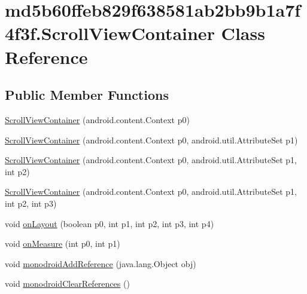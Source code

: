 \hypertarget{classmd5b60ffeb829f638581ab2bb9b1a7f4f3f_1_1_scroll_view_container}{
\section{md5b60ffeb829f638581ab2bb9b1a7f4f3f.ScrollViewContainer Class Reference}
\label{classmd5b60ffeb829f638581ab2bb9b1a7f4f3f_1_1_scroll_view_container}
}
\subsection*{Public Member Functions}
\begin{CompactItemize}
\item 
\hyperlink{classmd5b60ffeb829f638581ab2bb9b1a7f4f3f_1_1_scroll_view_container_4da9edc9a3c476f7f6f113c21e94f2c3}{ScrollViewContainer} (android.content.Context p0)
\item 
\hyperlink{classmd5b60ffeb829f638581ab2bb9b1a7f4f3f_1_1_scroll_view_container_9988f00f43908c747f96baaaaf9b6220}{ScrollViewContainer} (android.content.Context p0, android.util.AttributeSet p1)
\item 
\hyperlink{classmd5b60ffeb829f638581ab2bb9b1a7f4f3f_1_1_scroll_view_container_3daf03644acbaebadff91f69061c392e}{ScrollViewContainer} (android.content.Context p0, android.util.AttributeSet p1, int p2)
\item 
\hyperlink{classmd5b60ffeb829f638581ab2bb9b1a7f4f3f_1_1_scroll_view_container_2ec1c5ba20e2c2ddccb8e2c650187f32}{ScrollViewContainer} (android.content.Context p0, android.util.AttributeSet p1, int p2, int p3)
\item 
void \hyperlink{classmd5b60ffeb829f638581ab2bb9b1a7f4f3f_1_1_scroll_view_container_14c4115a2131636e6b15e7327ded3d04}{onLayout} (boolean p0, int p1, int p2, int p3, int p4)
\item 
void \hyperlink{classmd5b60ffeb829f638581ab2bb9b1a7f4f3f_1_1_scroll_view_container_31ed54d7d9fb3ae0c81c8582a15e49f4}{onMeasure} (int p0, int p1)
\item 
void \hyperlink{classmd5b60ffeb829f638581ab2bb9b1a7f4f3f_1_1_scroll_view_container_36cffa5f672764a8803bbd2b7aada5a0}{monodroidAddReference} (java.lang.Object obj)
\item 
void \hyperlink{classmd5b60ffeb829f638581ab2bb9b1a7f4f3f_1_1_scroll_view_container_140e7fc45e7ee876eabd1c71d9a77e80}{monodroidClearReferences} ()
\end{CompactItemize}
